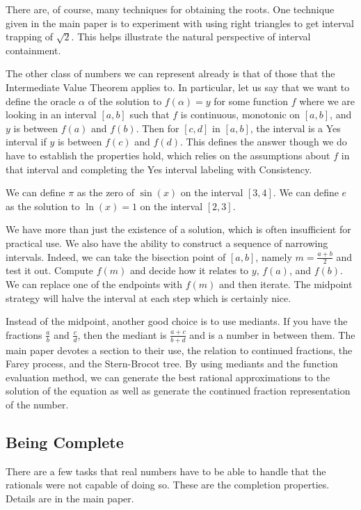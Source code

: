 \documentclass[12pt]{article}
\theoremstyle{remark}
\begin{document}
There are, of course, many techniques for obtaining the roots. One technique given in the main paper is to experiment with using right triangles to get interval trapping of $\sqrt{2}$. This helps illustrate the natural perspective of interval containment.  

The other class of numbers we can represent already is that of those that the Intermediate Value Theorem applies to. In particular, let us say that we want to define the oracle $\alpha$ of the solution to $f(\alpha) = y$ for some function $f$ where we are looking in an interval $[a,b]$ such that $f$ is continuous, monotonic on $[a,b]$, and $y$ is between $f(a)$ and $f(b)$. Then for $[c,d]$ in $[a,b]$, the interval is a Yes interval if $y$ is between $f(c)$ and $f(d)$. This defines the answer though we do have to establish the properties hold, which relies on the assumptions about $f$ in that interval and completing the Yes interval labeling with Consistency. 

We can define $\pi$ as the zero of $\sin(x)$ on the interval $[3,4]$. We can define $e$ as the solution to  $\ln(x)=1$ on the interval $[2,3]$. 

We have more than just the existence of a solution, which is often insufficient for practical use. We also have the ability to construct a sequence of narrowing intervals. Indeed, we can take the bisection point of $[a,b]$, namely $m =\frac{a+b}{2}$ and test it out. Compute $f(m)$ and decide how it relates to $y$, $f(a)$, and $f(b)$. We can replace one of the endpoints with $f(m)$ and then iterate.  The midpoint strategy will halve the interval at each step which is certainly nice. 

Instead of the midpoint, another good choice is to use mediants. If you have the fractions $\frac{a}{b}$ and $\frac{c}{d}$, then the mediant is $\frac{a+c}{b+d}$ and is a number in between them. The main paper devotes a section to their use, the relation to continued fractions, the Farey process, and the Stern-Brocot tree. By using mediants and the function evaluation method, we can generate the best rational approximations to the solution of the equation as well as generate the continued fraction representation of the number. 
 

\subsection{Being Complete}

There are a few tasks that real numbers have to be able to handle that the rationals were not capable of doing so. These are the completion properties. Details are in the main paper.
\end{document}
